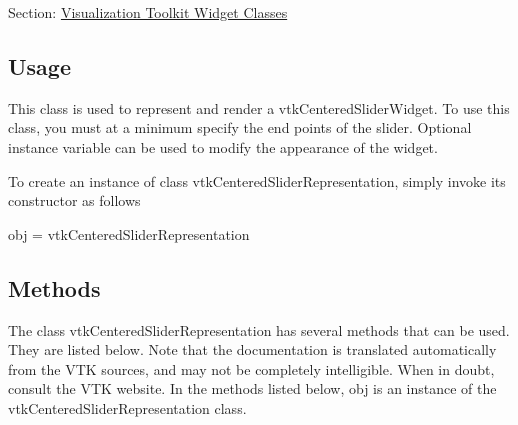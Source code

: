 Section\-: \hyperlink{sec_vtkwidgets}{Visualization Toolkit Widget Classes} \hypertarget{vtkwidgets_vtkxyplotwidget_Usage}{}\subsection{Usage}\label{vtkwidgets_vtkxyplotwidget_Usage}
This class is used to represent and render a vtk\-Centered\-Slider\-Widget. To use this class, you must at a minimum specify the end points of the slider. Optional instance variable can be used to modify the appearance of the widget.

To create an instance of class vtk\-Centered\-Slider\-Representation, simply invoke its constructor as follows \begin{DoxyVerb}  obj = vtkCenteredSliderRepresentation
\end{DoxyVerb}
 \hypertarget{vtkwidgets_vtkxyplotwidget_Methods}{}\subsection{Methods}\label{vtkwidgets_vtkxyplotwidget_Methods}
The class vtk\-Centered\-Slider\-Representation has several methods that can be used. They are listed below. Note that the documentation is translated automatically from the V\-T\-K sources, and may not be completely intelligible. When in doubt, consult the V\-T\-K website. In the methods listed below, {\ttfamily obj} is an instance of the vtk\-Centered\-Slider\-Representation class. 
